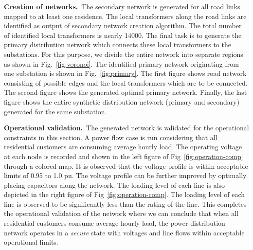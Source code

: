 \documentclass[sigconf]{acmart}
\begin{document}
\noindent\textbf{Creation of networks.}~The secondary network is generated for all road links mapped to at least one residence. The local transformers along the road links are identified as output of secondary network creation algorithm. The total number of identified local transformers is nearly 14000. The final task is to generate the primary distribution network which connects these local transformers to the substations. For this purpose, we divide the entire network into separate regions as shown in Fig.~\ref{fig:voronoi}. The identified primary network originating from one substation is shown in Fig.~\ref{fig:primary}. The first figure shows road network consisting of possible edges and the local transformers which are to be connected. The second figure shows the generated optimal primary network. Finally, the last figure shows the entire synthetic distribution network (primary and secondary) generated for the same substation.

\noindent\textbf{Operational validation.}~The generated network is validated for the operational constraints in this section. A power flow case is run considering that all residential customers are consuming average hourly load. The operating voltage at each node is recorded and shown in the left figure of Fig~\ref{fig:operation-comp} through a colored map. It is observed that the voltage profile is within acceptable limits of 0.95 to 1.0 pu. The voltage profile can be further improved by optimally placing capacitors along the network. The loading level of each line is also depicted in the right figure of Fig~\ref{fig:operation-comp}. The loading level of each line is observed to be significantly less than the rating of the line. This completes the operational validation of the network where we can conclude that when all residential customers consume average hourly load, the power distribution network operates in a \emph{secure} state with voltages and line flows within acceptable operational limits.
\end{document}
